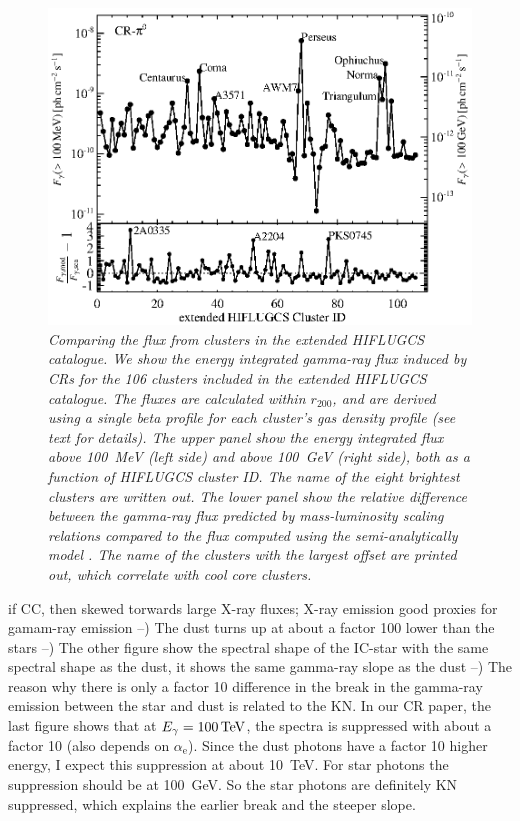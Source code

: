 \documentclass[10pt,aps,pra,reprint,amsmath,amsfonts,amssymb,showpacs]{revtex4-1}
\newcommand{\rmn}{\mathrm}
\newcommand{\tev}{\rm{TeV}}
\newcommand{\rvir}{r_{200}}
\newcommand{\e}{\rmn{e}}
\newcommand{\eg}{E_\gamma}
\begin{document}
\begin{figure}%
\begin{minipage}{2.0\columnwidth}
 \includegraphics[width=0.99\columnwidth]{figures/Flux.comp.CR.eps}
\caption{\it Comparing the flux from clusters in the extended HIFLUGCS
  catalogue. We show the energy integrated gamma-ray flux induced by
  CRs for the 106 clusters included in the extended HIFLUGCS
  catalogue. The fluxes are calculated within $\rvir$, and are derived
  using a single beta profile for each cluster's gas density profile
  (see text for details). The upper panel show the energy integrated
  flux above 100~MeV (left side) and above 100~GeV (right side), both
  as a function of HIFLUGCS cluster ID. The name of the eight
  brightest clusters are written out. The lower panel show the
  relative difference between the gamma-ray flux predicted by
  mass-luminosity scaling relations compared to the flux computed
  using the semi-analytically model \cite{2010MNRAS.409..449P}. The
  name of the clusters with the largest offset are printed out, which
  correlate with cool core clusters.}
 \label{fig19}
\end{minipage}
\end{figure}
if CC, then skewed torwards large X-ray fluxes; X-ray emission good
proxies for gamam-ray emission --) The dust turns up at about a factor
100 lower than the stars --) The other figure show the spectral shape
of the IC-star with the same spectral shape as the dust, it shows the
same gamma-ray slope as the dust --) The reason why there is only a
factor 10 difference in the break in the gamma-ray emission between
the star and dust is related to the KN. In our CR paper, the last
figure shows that at $\eg=100\,\tev$, the spectra is suppressed with
about a factor 10 (also depends on $\alpha_\e$). Since the dust
photons have a factor 10 higher energy, I expect this suppression at
about 10~TeV. For star photons the suppression should be at
100~GeV. So the star photons are definitely KN suppressed, which
explains the earlier break and the steeper slope.
\end{document}
